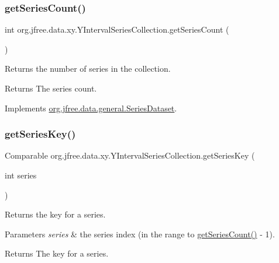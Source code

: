 \subsubsection{\texorpdfstring{get\+Series\+Count()}{getSeriesCount()}}
{\footnotesize\ttfamily int org.\+jfree.\+data.\+xy.\+Y\+Interval\+Series\+Collection.\+get\+Series\+Count (\begin{DoxyParamCaption}{ }\end{DoxyParamCaption})}

Returns the number of series in the collection.

\begin{DoxyReturn}{Returns}
The series count. 
\end{DoxyReturn}


Implements \mbox{\hyperlink{interfaceorg_1_1jfree_1_1data_1_1general_1_1_series_dataset_a84fe822f5918f941d9de1ed1b73c9f58}{org.\+jfree.\+data.\+general.\+Series\+Dataset}}.

\mbox{\label{classorg_1_1jfree_1_1data_1_1xy_1_1_y_interval_series_collection_a7901701d59661b8b7a758a504668f258}} 
\subsubsection{\texorpdfstring{get\+Series\+Key()}{getSeriesKey()}}
{\footnotesize\ttfamily Comparable org.\+jfree.\+data.\+xy.\+Y\+Interval\+Series\+Collection.\+get\+Series\+Key (\begin{DoxyParamCaption}\item[{int}]{series }\end{DoxyParamCaption})}

Returns the key for a series.


\begin{DoxyParams}{Parameters}
{\em series} & the series index (in the range {} to {\ttfamily \mbox{\hyperlink{classorg_1_1jfree_1_1data_1_1xy_1_1_y_interval_series_collection_ac7e43d8de0b3233231f55f21f865e242}{get\+Series\+Count()}} -\/ 1}).\\
\hline
\end{DoxyParams}
\begin{DoxyReturn}{Returns}
The key for a series.
\end{DoxyReturn}

